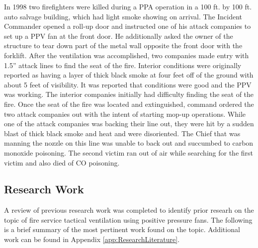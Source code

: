 \documentclass{article}
\begin{document}
In 1998 two firefighters were killed during a PPA operation in a 100 ft. by 100 ft. auto salvage building, which had light smoke showing on arrival. The Incident Commander opened a roll-up door and instructed one of his attack companies to set up a PPV fan at the front door. He additionally asked the owner of the structure to tear down part of the metal wall opposite the front door with the forklift. After the ventilation was accomplished, two companies made entry with 1.5” attack lines to find the seat of the fire. Interior conditions were originally reported as having a layer of thick black smoke at four feet off of the ground with about 5 feet of visibility. It was reported that conditions were good and the PPV was working. The interior companies initially had difficulty finding the seat of the fire. Once the seat of the fire was located and extinguished, command ordered the two attack companies out with the intent of starting mop-up operations. While one of the attack companies was backing their line out, they were hit by a sudden blast of thick black smoke and heat and were disoriented. The Chief that was manning the nozzle on this line was unable to back out and succumbed to carbon monoxide poisoning. The second victim ran out of air while searching for the first victim and also died of CO poisoning.\cite{NIOSHF1998_32}

\subsection{Research Work}
A review of previous research work was completed to identify prior researh on the topic of fire service tactical ventilation using positive pressure fans. The following is a brief summary of the most pertinent work found on the topic. Additional work can be found in Appendix \ref{app:ResearchLiterature}.

\end{document}

